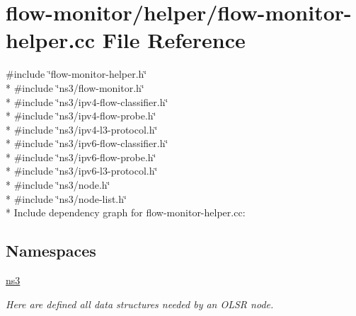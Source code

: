 \hypertarget{flow-monitor-helper_8cc}{}\section{flow-\/monitor/helper/flow-\/monitor-\/helper.cc File Reference}
\label{flow-monitor-helper_8cc}
{\ttfamily \#include \char`\"{}flow-\/monitor-\/helper.\+h\char`\"{}}\\*
{\ttfamily \#include \char`\"{}ns3/flow-\/monitor.\+h\char`\"{}}\\*
{\ttfamily \#include \char`\"{}ns3/ipv4-\/flow-\/classifier.\+h\char`\"{}}\\*
{\ttfamily \#include \char`\"{}ns3/ipv4-\/flow-\/probe.\+h\char`\"{}}\\*
{\ttfamily \#include \char`\"{}ns3/ipv4-\/l3-\/protocol.\+h\char`\"{}}\\*
{\ttfamily \#include \char`\"{}ns3/ipv6-\/flow-\/classifier.\+h\char`\"{}}\\*
{\ttfamily \#include \char`\"{}ns3/ipv6-\/flow-\/probe.\+h\char`\"{}}\\*
{\ttfamily \#include \char`\"{}ns3/ipv6-\/l3-\/protocol.\+h\char`\"{}}\\*
{\ttfamily \#include \char`\"{}ns3/node.\+h\char`\"{}}\\*
{\ttfamily \#include \char`\"{}ns3/node-\/list.\+h\char`\"{}}\\*
Include dependency graph for flow-\/monitor-\/helper.cc\+:
\subsection*{Namespaces}
\begin{DoxyCompactItemize}
\item 
 \hyperlink{namespacens3}{ns3}
\begin{DoxyCompactList}\small\item\em Here are defined all data structures needed by an O\+L\+SR node. \end{DoxyCompactList}\end{DoxyCompactItemize}
